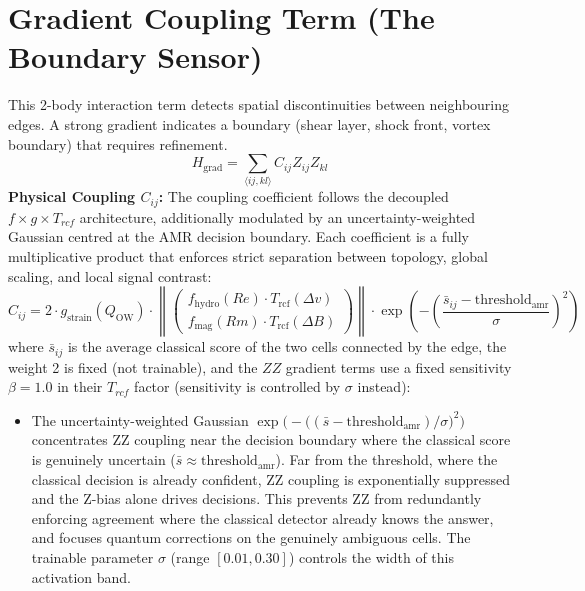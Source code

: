\documentclass[12pt, a4paper, oneside]{report}
\begin{document}
\section{Gradient Coupling Term (The Boundary Sensor)}
This 2-body interaction term detects spatial discontinuities between neighbouring edges. A strong gradient indicates a boundary (shear layer, shock front, vortex boundary) that requires refinement.
\begin{equation}
    H_{\text{grad}} = \sum_{\langle ij, kl \rangle} C_{ij} Z_{ij} Z_{kl}
\end{equation}
\textbf{Physical Coupling $C_{ij}$:} The coupling coefficient follows the decoupled $f \times g \times T_{rcf}$ architecture, additionally modulated by an uncertainty-weighted Gaussian centred at the AMR decision boundary. Each coefficient is a fully multiplicative product that enforces strict separation between topology, global scaling, and local signal contrast:
\begin{equation}
    C_{ij} = 2 \cdot g_{\text{strain}}(Q_{\text{OW}}) \cdot \left\|\begin{pmatrix} f_{\text{hydro}}(Re) \cdot T_{\text{rcf}}(\Delta v) \\ f_{\text{mag}}(Rm) \cdot T_{\text{rcf}}(\Delta B) \end{pmatrix}\right\|
    \cdot \exp\!\left(-\left(\frac{\bar{s}_{ij} - \text{threshold}_{\text{amr}}}{\sigma}\right)^{\!2}\right)
\end{equation}
where $\bar{s}_{ij}$ is the average classical score of the two cells connected by the edge, the weight 2 is fixed (not trainable), and the $ZZ$ gradient terms use a fixed sensitivity $\beta = 1.0$ in their $T_{rcf}$ factor (sensitivity is controlled by $\sigma$ instead):
\begin{itemize}
    \item The uncertainty-weighted Gaussian $\exp\bigl(-\bigl((\bar{s} - \text{threshold}_{\text{amr}})/\sigma\bigr)^2\bigr)$ concentrates ZZ coupling near the decision boundary where the classical score is genuinely uncertain ($\bar{s} \approx \text{threshold}_{\text{amr}}$). Far from the threshold, where the classical decision is already confident, ZZ coupling is exponentially suppressed and the Z-bias alone drives decisions. This prevents ZZ from redundantly enforcing agreement where the classical detector already knows the answer, and focuses quantum corrections on the genuinely ambiguous cells. The trainable parameter $\sigma$ (range $[0.01, 0.30]$) controls the width of this activation band.
\end{itemize}
\end{document}
